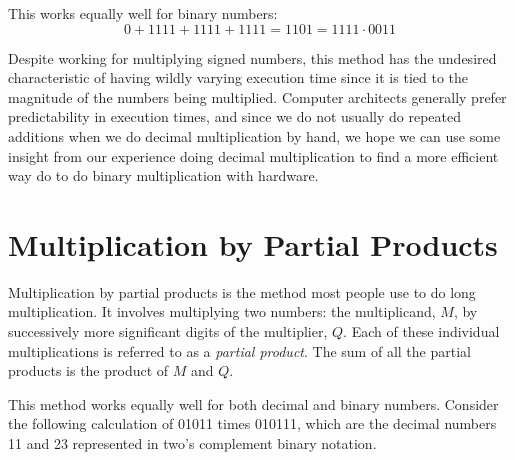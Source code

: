 \documentclass{article}
\begin{document}
This works equally well for binary numbers: %
\begin{equation}
0 + 1111 + 1111 + 1111 = 1101 = 1111 \cdot 0011
\end{equation}

Despite working for multiplying signed numbers, this method has the undesired characteristic of having wildly varying execution time since it is tied to the magnitude of the numbers being multiplied.
Computer architects generally prefer predictability in execution times, and since we do not usually do repeated additions when we do decimal multiplication by hand, we hope we can use some insight from our experience doing decimal multiplication to find a more efficient way do to do binary multiplication with hardware.

\section{Multiplication by Partial Products}
Multiplication by partial products is the method most people use to do long multiplication.
It involves multiplying two numbers: the multiplicand, $M$, by successively more significant digits of the multiplier, $Q$.%
Each of these individual multiplications is referred to as a \textsl{partial product}.
The sum of all the partial products is the product of $M$ and $Q$.


This method works equally well for both decimal and binary numbers.
Consider the following calculation of 01011 times 010111, which are the decimal numbers 11 and 23 represented in two's complement binary notation.
\end{document}
